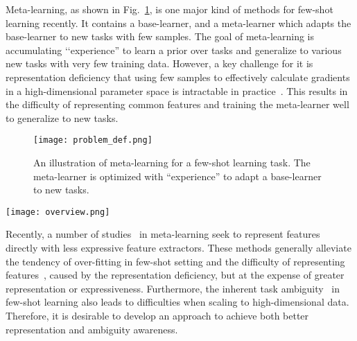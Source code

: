 \documentclass[10pt,conference,a4paper]{IEEEtran}
\begin{document}
Meta-learning, as shown in Fig.~\ref{problem_def}, is one major kind of methods for few-shot learning recently. It contains a base-learner, and a meta-learner which adapts the base-learner to new tasks with few samples. The goal of meta-learning is accumulating ‘‘experience'' to learn a prior over tasks and generalize to various new tasks with very few training data. However, a key challenge for it is representation deficiency that using few samples to effectively calculate gradients in a high-dimensional parameter space is intractable in practice~\cite{rusu2019meta}. This results in the difficulty of representing common features and training the meta-learner well to generalize to new tasks.

\begin{figure}[tp]
	\centerline{\texttt{[image: problem\_def.png]}}
	\caption{An illustration of meta-learning for a few-shot learning task. The meta-learner is optimized with “experience” to adapt a base-learner to new tasks.}
	\label{problem_def}
\end{figure}

\begin{figure*}[htbp]
	\centerline{\texttt{[image: overview.png]}}
	\caption{Overview of the proposed method. The figure shows a typical 5-way 1-shot task based on our approach where the solid lines indicate the training process and the dashed lines indicate the test process during meta-training. Given an unseen sample from query set, the latent code \textbf{z} with additional information, reconstructed in latent space, contributes to better representations.}
	\label{overview}
\end{figure*}

Recently, a number of studies~\cite{finn2017model, vinyals2016matching, snell2017prototypical, PLATIPUS2018, bayesianMAML2018} in meta-learning seek to represent features directly with less expressive feature extractors. These methods generally alleviate the tendency of over-fitting in few-shot setting and the difficulty of representing features~\cite{Sun2019Meta, hui2019self}, caused by the representation deficiency, but at the expense of greater representation or expressiveness. Furthermore, the inherent task ambiguity~\cite{PLATIPUS2018} in few-shot learning also leads to difficulties when scaling to high-dimensional data. Therefore, it is desirable to develop an approach to achieve both better representation and ambiguity awareness.
\end{document}
